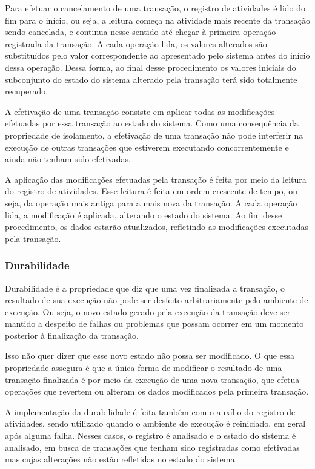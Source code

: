 \documentclass[11pt,twoside,a4paper]{book}
\begin{document}
Para efetuar o cancelamento de uma transação, o registro de atividades é lido do fim para o início, ou seja, a leitura começa na atividade mais recente da transação sendo cancelada, e continua nesse sentido até chegar à primeira operação registrada da transação. A cada operação lida, os valores alterados são substituídos pelo valor correspondente ao apresentado pelo sistema antes do início dessa operação. Dessa forma, ao final desse procedimento os valores iniciais do subconjunto do estado do sistema alterado pela transação terá sido totalmente recuperado.

A efetivação de uma transação consiste em aplicar todas as modificações efetuadas por essa transação ao estado do sistema. Como uma consequência da propriedade de isolamento, a efetivação de uma transação não pode interferir na execução de outras transações que estiverem executando concorrentemente e ainda não tenham sido efetivadas.

A aplicação das modificações efetuadas pela transação é feita por meio da leitura do registro de atividades. Esse leitura é feita em ordem crescente de tempo, ou seja, da operação mais antiga para a mais nova da transação. A cada operação lida, a modificação é aplicada, alterando o estado do sistema. Ao fim desse procedimento, os dados estarão atualizados, refletindo as modificações executadas pela transação.

\subsubsection*{Durabilidade}
Durabilidade é a propriedade que diz que uma vez finalizada a transação, o resultado de sua execução não pode ser desfeito arbitrariamente pelo ambiente de execução. Ou seja, o novo estado gerado pela execução da transação deve ser mantido a despeito de falhas ou problemas que possam ocorrer em um momento posterior à finalização da transação.

Isso não quer dizer que esse novo estado não possa ser modificado. O que essa propriedade assegura é que a única forma de modificar o resultado de uma transação finalizada é por meio da execução de uma nova transação, que efetua operações que revertem ou alteram os dados modificados pela primeira transação.

A implementação da durabilidade é feita também com o auxílio do registro de atividades, sendo utilizado quando o ambiente de execução é reiniciado, em geral após alguma falha. Nesses casos, o registro é analisado e o estado do sistema é analisado, em busca de transações que tenham sido registradas como efetivadas mas cujas alterações não estão refletidas no estado do sistema.
\end{document}
